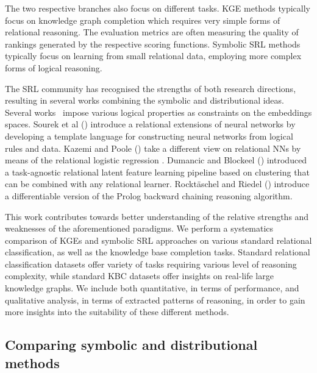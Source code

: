 The two respective branches also focus on different tasks.
KGE methods typically focus on knowledge graph completion which requires very simple forms of relational reasoning. The evaluation metrics are often measuring the quality of rankings generated by the respective scoring functions.
Symbolic SRL methods typically focus on learning from small relational data, employing more complex forms of logical reasoning.




The SRL community has recognised the strengths of both research directions, resulting in several works combining the symbolic and distributional ideas.
Several works~\cite{DBLP:conf/uai/MinerviniDRR17,demeester2016lifted} impose various logical properties as constraints on the embeddings spaces.
Sourek et al (\cite{Sourek:2015:LRN:2996831.2996838})  introduce a relational extensions of neural networks by developing a template language for constructing neural networks from logical rules and data.
Kazemi and Poole (\cite{Kazemi2018}) take a different view on relational NNs by means of the relational logistic regression \cite{KazemiLR2014}.
Dumancic and Blockeel (\cite{Dumancic2017}) introduced a task-agnostic relational latent feature learning pipeline based on clustering that can be combined with any relational learner.
Rockt\"{a}schel and Riedel (\cite{DTP2017}) introduce a differentiable version of the Prolog backward chaining reasoning algorithm.



This work contributes towards better understanding of the relative strengths and weaknesses of the aforementioned paradigms.
We perform a systematics comparison of KGEs and symbolic SRL approaches on various standard relational classification, as well as the knowledge base completion tasks.
Standard relational classification datasets offer variety of tasks requiring various level of reasoning complexity, while standard KBC datasets offer insights on real-life large knowledge graphs.
We include both quantitative, in terms of performance, and qualitative analysis, in terms of extracted patterns of reasoning, in order to gain more insights into the suitability of these different methods.




 




\subsection{Comparing symbolic and distributional methods}


